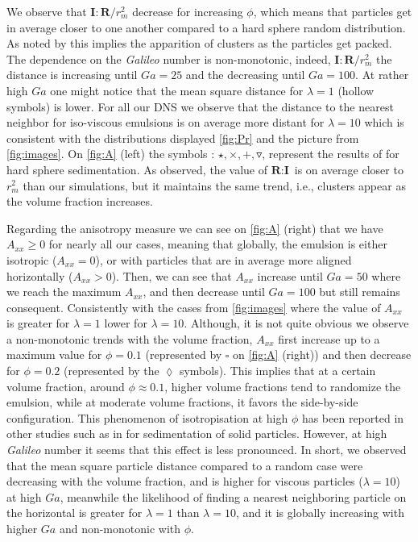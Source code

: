 We observe that $\textbf{I}:\textbf{R}/r_m^2$  decrease for increasing $\phi$, which means that particles get in average closer to one another compared to a hard sphere random distribution. 
As noted by \citet{zhang2023evolution} this implies the apparition of clusters as the particles get packed. 
The dependence on the \textit{Galileo} number is non-monotonic, indeed, $\textbf{I}:\textbf{R}/r_m^2$ the distance is increasing until $Ga = 25$ and the decreasing until $Ga = 100$.  
At rather high $Ga$ one might notice that the mean square distance for $\lambda = 1$ (hollow symbols) is lower. 
For all our DNS we observe that the distance to the nearest neighbor for iso-viscous emulsions is on average more distant for $\lambda = 10$ which is consistent with the distributions displayed \ref{fig:Pr} and the picture from \ref{fig:images}.  
On \ref{fig:A} (left) the symbols : $\pmb\star, \pmb\times,\pmb +, \pmb\triangledown$, represent the results of \citet{zhang2023evolution} for hard sphere sedimentation. 
As observed, the value of $\textbf{R}:\textbf{I}$ is on average closer to $r_m^2$ than our simulations, but it maintains the same trend, i.e., clusters appear as the volume fraction increases.
 
Regarding the anisotropy measure we can see on \ref{fig:A} (right) that we have $A_{xx} \ge 0$ for nearly all our cases, meaning that globally, the emulsion is either isotropic ($A_{xx} = 0$), or with particles that are in average more aligned horizontally ($A_{xx} >0$). 
Then, we can see that $A_{xx}$ increase until $Ga = 50$ where we reach the maximum $A_{xx}$, and then decrease until $Ga =100$  but still remains consequent. 
Consistently with the cases from \ref{fig:images} where the value of $A_{xx}$ is greater for $\lambda = 1$ lower for  $\lambda = 10$.
Although, it is not quite obvious we observe a non-monotonic trends with the volume fraction, $A_{xx}$ first increase up to a maximum value for $\phi =0.1$ (represented by \textcolor{col3}{$\pmb\square$} on \ref{fig:A} (right)) and then decrease for $\phi=0.2$ (represented by the \textcolor{col4}{$\pmb\lozenge$} symbols). 
This implies that at a certain volume fraction, around $\phi \approx 0.1$, higher volume fractions tend to randomize the emulsion, while at moderate volume fractions, it favors the side-by-side configuration.
This phenomenon of isotropisation at high $\phi$ has been reported in other studies such as in \citet{seyed2021sedimentation} for sedimentation of solid particles. 
However, at high \textit{Galileo} number it seems that this effect is less pronounced. 
In short, we observed that the mean square particle distance compared to a random case were decreasing with the volume fraction, and is higher for viscous particles ($\lambda = 10$) at high $Ga$, meanwhile the likelihood of finding a nearest neighboring particle on the horizontal is greater for $\lambda=1$ than $\lambda = 10$, and it is globally increasing with higher $Ga$ and non-monotonic with $\phi$. 


